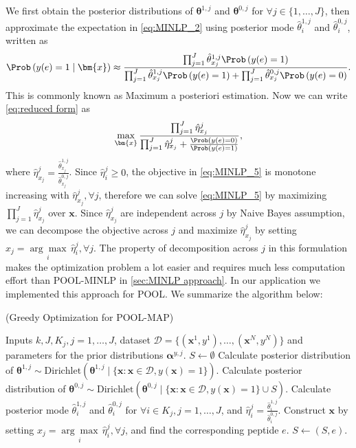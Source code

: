 We first obtain the posterior distributions of $\bm{\theta}^{1, j}$ and $\bm{\theta}^{0, j}$ for $\forall j \in \{1, \ldots, J\}$, 
then approximate the expectation in \eqref{eq:MINLP_2} using posterior mode $\hat{\theta}^{1,j}_i$ and $\hat{\theta}^{0,j}_i$, written
as 
\begin{equation*}
  \Prob \left(y(e \right) = 1 \mid \bm{x}) \approx \frac{\prod_{j=1}^J \hat{\theta}^{1, j}_{x_j} \Prob\left( y(e)=1 \right)}{\prod_{j=1}^J \hat{\theta}^{1, j}_{x_j} \Prob\left( y(e)=1 \right) + \prod_{j=1}^J \hat{\theta}^{0, j}_{x_j} \Prob\left( y(e)=0 \right)}.
\end{equation*}
This is commonly known as Maximum a posteriori estimation. Now we can write
\eqref{eq:reduced form} as 
\begin{equation}
  \max_{\bm{x}} \frac{\prod_{j=1}^J \hat{\eta}^j_{x_j}}{\prod_{j=1}^J \hat{\eta}^j_{x_j} + \frac{\Prob \left(y(e) = 0 \right)}{\Prob \left( y(e) = 1 \right)}},
  \label{eq:MINLP_5}
\end{equation}
where $\hat{\eta}^j_{x_j} = \frac{\hat{\theta}^{1,j}_{x_j}}{\hat{\theta}^{0,j}_{x_j}}$. Since $\hat{\eta}^j_i \geq 0$, the objective 
in \eqref{eq:MINLP_5} is monotone increasing with $\hat{\eta}^j_{x_j}, \forall j$, therefore we can solve \eqref{eq:MINLP_5} by
maximizing $\prod_{j=1}^J \hat{\eta}^j_{x_j}$ over $\bm{x}$. Since $\hat{\eta}^j_{x_j}$ are independent across $j$ by Naive Bayes
assumption, we can decompose the objective across $j$ and maximize $\hat{\eta}^j_{x_j}$ by setting 
$x_j = \underset{i}{\arg\max} \, \hat{\eta}^j_i, \forall j$. The property of decomposition across $j$ in this formulation makes the
optimization problem a lot easier and requires much less computation effort than POOL-MINLP in \ref{sec:MINLP approach}. In our
application we implemented this approach for POOL. We summarize the algorithm below:
\begin{Algorithm}(Greedy Optimization for POOL-MAP) \label{algo2}
\begin{algorithmic}[1]
  \REQUIRE Inputs $k, J, K_j, j = 1, \ldots, J$, dataset $\mathcal{D} = 
  \{(\bm{x}^1, y^1), \ldots, (\bm{x}^N, y^N)\}$ and parameters for the prior 
  distributions $\bm{\alpha}^{y, j}$.
  \STATE $S \leftarrow \emptyset $
  \STATE Calculate posterior distribution of $\bm{\theta}^{1, j} \sim 
  \text{Dirichlet} (\bm{\theta}^{1, j} \mid \{\bm{x}: \bm{x} \in \mathcal{D}, 
  y(\bm{x}) = 1\})$.
    \STATE Calculate posterior distribution of $\bm{\theta}^{0, j} \sim 
    \text{Dirichlet} (\bm{\theta}^{0, j} \mid \{\bm{x}: \bm{x} \in \mathcal{D}, 
    y(\bm{x}) = 1\} \cup S)$.
    \STATE Calculate posterior mode $\hat{\theta}^{1, j}_i$ and $\hat{\theta}^{0, j}_i$ for $\forall i \in K_j, j = 1, \ldots, J$, and $\hat{\eta}^j_i = \frac{\hat{\theta}^{1, j}_i}{\hat{\theta}^{0, j}_i}$.
    \STATE Construct $\bm{x}$ by setting $x_j = \underset{i}{\arg\max} \, \hat{\eta}^j_i, \forall j$, and find the corresponding peptide $e$.
    \STATE $S \leftarrow (S, e)$.
  \ENDFOR
\end{algorithmic}
\end{Algorithm}
